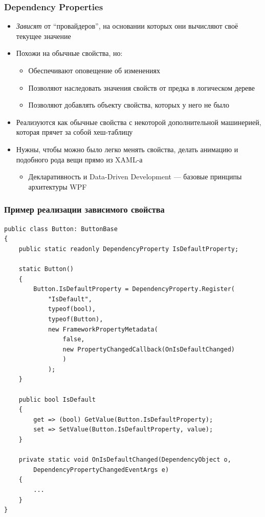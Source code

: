 \documentclass[xetex,mathserif,serif]{beamer}
\begin{document}
	\begin{frame}
		\frametitle{Dependency Properties}
		\begin{itemize}
			\item \textit{Зависят} от ``провайдеров'', на основании которых они вычисляют своё текущее значение
			\item Похожи на обычные свойства, но:
			\begin{itemize}
				\item Обеспечивают оповещение об изменениях
				\item Позволяют наследовать значения свойств от предка в логическом дереве
				\item Позволяют добавлять объекту свойства, которых у него не было
			\end{itemize}
			\item Реализуются как обычные свойства с некоторой дополнительной машинерией, которая прячет за собой хеш-таблицу
			\item Нужны, чтобы можно было легко менять свойства, делать анимацию и подобного рода вещи прямо из XAML-а
			\begin{itemize}
				\item Декларативность и Data-Driven Development --- базовые принципы архитектуры WPF
			\end{itemize}
		\end{itemize}
	\end{frame}

	\begin{frame}[fragile]
		\frametitle{Пример реализации зависимого свойства}
		\begin{tiny}
			\begin{verbatim}
public class Button: ButtonBase
{
    public static readonly DependencyProperty IsDefaultProperty;

    static Button()
    {
        Button.IsDefaultProperty = DependencyProperty.Register(
            "IsDefault",
            typeof(bool),
            typeof(Button),
            new FrameworkPropertyMetadata(
                false, 
                new PropertyChangedCallback(OnIsDefaultChanged)
                )
            );
    }

    public bool IsDefault
    {
        get => (bool) GetValue(Button.IsDefaultProperty);
        set => SetValue(Button.IsDefaultProperty, value);
    }

    private static void OnIsDefaultChanged(DependencyObject o, 
        DependencyPropertyChangedEventArgs e)
    {
        ...
    }
}
			\end{verbatim}
		\end{tiny}
	\end{frame}
\end{document}
